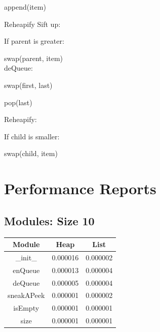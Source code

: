 \documentclass{article}
\begin{document}
\hspace{\parindent}append(item)

\hspace{\parindent}Reheapify Sift up:

\hspace{\parindent}\hspace{\parindent}If parent is greater:

\hspace{\parindent}\hspace{\parindent}\hspace{\parindent}swap(parent, item)\\

deQueue:

\hspace{\parindent}swap(first, last)

\hspace{\parindent}pop(last)

\hspace{\parindent}Reheapify:

\hspace{\parindent}\hspace{\parindent}If child is smaller:

\hspace{\parindent}\hspace{\parindent}\hspace{\parindent}swap(child, item)

\newpage
\section{Performance Reports}
\subsection{Modules: Size 10}
\begin{table}[H]
    \begin{tabular}{c c c}
        Module & Heap & List \\ \hline
        \_init\_ & 0.000016 & 0.000002 \\ 
        enQueue & 0.000013 & 0.000004 \\
        deQueue & 0.000005 & 0.000004 \\
        sneakAPeek & 0.000001 & 0.000002 \\
        isEmpty & 0.000001 & 0.000001 \\
        size & 0.000001 & 0.000001 \\
    \end{tabular}
\end{table}
\end{document}
